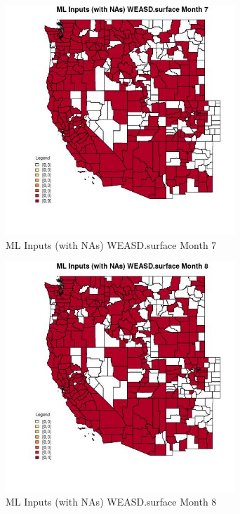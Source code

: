\begin{figure} 
\centering  
\includegraphics[width=0.77\textwidth]{Code_Outputs/Report_ML_input_PM25_Step4_part_e_de_duplicated_aves_compiled_2019-05-21wNAs_CountyWEASDsurfacemedianMonth7.jpg} 
\caption{\label{fig:Report_ML_input_PM25_Step4_part_e_de_duplicated_aves_compiled_2019-05-21wNAsCountyWEASDsurfacemedianMonth7}ML Inputs (with NAs) WEASD.surface Month 7} 
\end{figure} 
 

\begin{figure} 
\centering  
\includegraphics[width=0.77\textwidth]{Code_Outputs/Report_ML_input_PM25_Step4_part_e_de_duplicated_aves_compiled_2019-05-21wNAs_CountyWEASDsurfacemedianMonth8.jpg} 
\caption{\label{fig:Report_ML_input_PM25_Step4_part_e_de_duplicated_aves_compiled_2019-05-21wNAsCountyWEASDsurfacemedianMonth8}ML Inputs (with NAs) WEASD.surface Month 8} 
\end{figure} 
 

